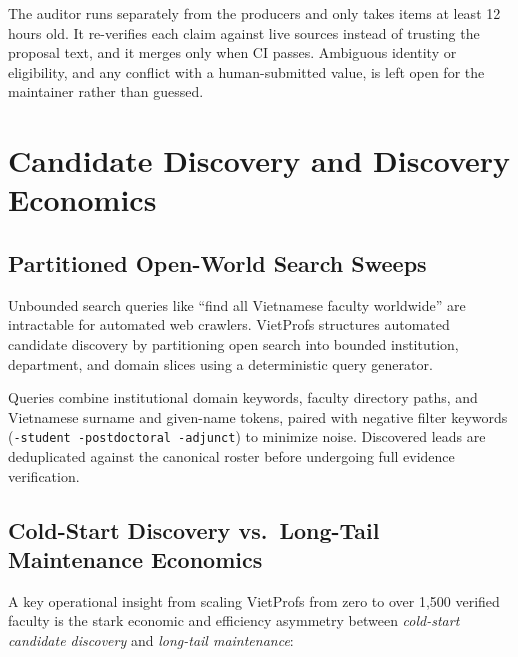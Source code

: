 \documentclass[11pt]{article}
\newcommand{\code}[1]{\texttt{\small #1}}
\begin{document}
The auditor runs separately from the producers and only takes items at least 12 hours old. It re-verifies each claim against live sources instead of trusting the proposal text, and it merges only when CI passes. Ambiguous identity or eligibility, and any conflict with a human-submitted value, is left open for the maintainer rather than guessed.

\section{Candidate Discovery and Discovery Economics}
\label{sec:discovery}

\subsection{Partitioned Open-World Search Sweeps}
Unbounded search queries like ``find all Vietnamese faculty worldwide'' are intractable for automated web crawlers. VietProfs structures automated candidate discovery by partitioning open search into bounded institution, department, and domain slices using a deterministic query generator.

Queries combine institutional domain keywords, faculty directory paths, and Vietnamese surname and given-name tokens, paired with negative filter keywords (\code{-student -postdoctoral -adjunct}) to minimize noise. Discovered leads are deduplicated against the canonical roster before undergoing full evidence verification.

\subsection{Cold-Start Discovery vs.\ Long-Tail Maintenance Economics}
\label{sec:economics}
A key operational insight from scaling VietProfs from zero to over 1,500 verified faculty is the stark economic and efficiency asymmetry between \emph{cold-start candidate discovery} and \emph{long-tail maintenance}:
\end{document}
